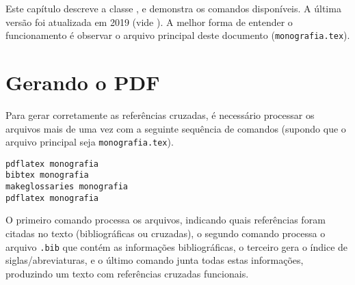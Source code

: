 \newcommand{\texCommand}[1]{\texttt{\textbackslash{#1}}}%

\newcommand{\exemplo}[1]{%
	\vspace{\baselineskip}%
	\noindent\fbox{\begin{minipage}{\textwidth}#1\end{minipage}}%
	\\\vspace{\baselineskip}}%

\newcommand{\exemploVerbatim}[1]{%
	\vspace{\baselineskip}%
	\noindent\fbox{\begin{minipage}{\textwidth}%
			#1\end{minipage}}%
	\\\vspace{\baselineskip}}%


Este capítulo descreve a classe \unbene, e demonstra os comandos disponíveis. A última versão foi
atualizada em 2019 (vide ). A melhor forma de entender o funcionamento é observar
o arquivo principal deste documento (\texttt{monografia.tex}).

\section{Gerando o PDF}
Para gerar corretamente as referências cruzadas, é necessário processar os arquivos mais de uma vez
com a seguinte sequência de comandos (supondo que o arquivo principal seja \texttt{monografia.tex}).

\begin{verbatim}
pdflatex monografia
bibtex monografia
makeglossaries monografia
pdflatex monografia
\end{verbatim}

O primeiro comando processa os arquivos, indicando quais referências foram citadas no texto 
(bibliográficas ou cruzadas), o segundo comando processa o arquivo \texttt{.bib} que contém as 
informações bibliográficas, o terceiro gera o índice de siglas/abreviaturas, e o último comando 
junta todas estas informações, produzindo um texto com referências cruzadas funcionais.


